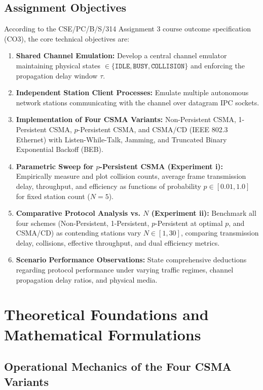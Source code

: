 \documentclass[11pt,a4paper]{article}
\begin{document}
\subsection{Assignment Objectives}
According to the CSE/PC/B/S/314 Assignment 3 course outcome specification (CO3), the core technical objectives are:
\begin{enumerate}
    \item \textbf{Shared Channel Emulation:} Develop a central channel emulator maintaining physical states $\in \{\texttt{IDLE}, \texttt{BUSY}, \texttt{COLLISION}\}$ and enforcing the propagation delay window $\tau$.
    \item \textbf{Independent Station Client Processes:} Emulate multiple autonomous network stations communicating with the channel over datagram IPC sockets.
    \item \textbf{Implementation of Four CSMA Variants:} Non-Persistent CSMA, 1-Persistent CSMA, $p$-Persistent CSMA, and CSMA/CD (IEEE 802.3 Ethernet) with Listen-While-Talk, Jamming, and Truncated Binary Exponential Backoff (BEB).
    \item \textbf{Parametric Sweep for $p$-Persistent CSMA (Experiment i):} Empirically measure and plot collision counts, average frame transmission delay, throughput, and efficiency as functions of probability $p \in [0.01, 1.0]$ for fixed station count ($N=5$).
    \item \textbf{Comparative Protocol Analysis vs. $N$ (Experiment ii):} Benchmark all four schemes (Non-Persistent, 1-Persistent, $p$-Persistent at optimal $p$, and CSMA/CD) as contending stations vary $N \in [1, 30]$, comparing transmission delay, collisions, effective throughput, and dual efficiency metrics.
    \item \textbf{Scenario Performance Observations:} State comprehensive deductions regarding protocol performance under varying traffic regimes, channel propagation delay ratios, and physical media.
\end{enumerate}

\newpage

\section{Theoretical Foundations and Mathematical Formulations}

\subsection{Operational Mechanics of the Four CSMA Variants}
\end{document}
